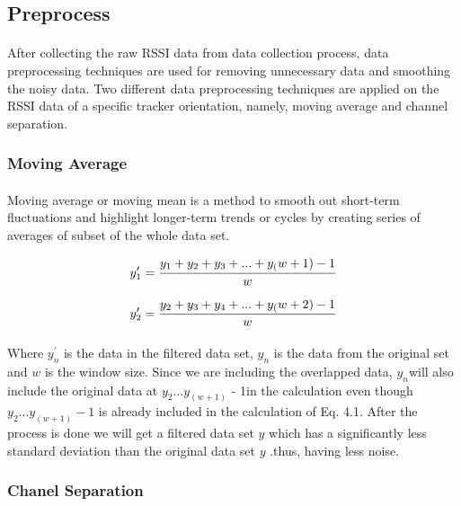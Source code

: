 \subsection{Preprocess}
\paragraph{}After collecting the raw RSSI data from data collection process, data preprocessing techniques are used for removing unnecessary data and smoothing the noisy data. Two different data preprocessing techniques are applied on the RSSI data of a specific tracker orientation, namely, moving average and channel separation.
\subsubsection{Moving Average}
\paragraph{}Moving average or moving mean is a method to smooth out short-term fluctuations and highlight longer-term trends or cycles by creating series of averages of subset of the whole data set.

\begin{equation}
\centering
y^\prime_1 = \frac{y_1+y_2+y_3+...+y_(w+1)-1}{w}
\label{fig:eqt1}
\end{equation}

\begin{equation}
\centering
y^\prime_2 = \frac{y_2+y_3+y_4+...+y_(w+2)-1}{w} 
\label{fig:eqt1}
\end{equation}

\paragraph{}Where $y^\prime_n$ is the data in the filtered data set, $y_n$ is the data from the original
set and $w$ is the window size. Since we are including the overlapped data, $y_n$will also include the original data at $y_2...y_(w+1)$ - 1in the calculation even though $y_2...y_(w+1) - 1$ is already included in the calculation of Eq. 4.1. After the process is done we will get a filtered data set $y$ which has a significantly less standard deviation than the original data set $y$ .thus, having less noise.

\subsubsection{Chanel Separation}
